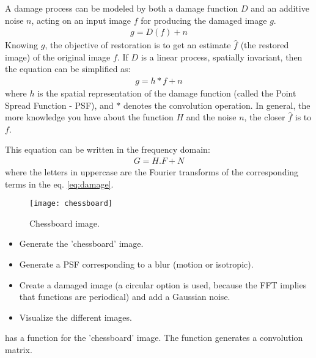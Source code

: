 A damage process can be modeled by both a damage function $D$ and an additive noise $n$, acting on an input image $f$ for producing the damaged image $g$.
\begin{eqnarray}
g=D(f)+n
\end{eqnarray}
Knowing $g$, the objective of restoration is to get an estimate $\hat{f}$ (the restored image) of the original image $f$. If $D$ is a linear process, spatially invariant, then the equation can be simplified as:
\begin{eqnarray}
g=h*f+n \label{eq:damage}
\end{eqnarray} 
where $h$ is the spatial representation of the damage function (called the Point Spread Function - PSF), and $*$ denotes the convolution operation.
In general, the more knowledge you have about the function $H$ and the noise $n$, the closer $\hat{f}$ is to $f$.

This equation can be written in the frequency domain:
\begin{eqnarray}
G=H.F+N
\end{eqnarray}
where the letters in uppercase are the Fourier transforms of the corresponding terms in the eq. \ref{eq:damage}.

	\begin{figure}[htbp]
	 \centering\caption{Chessboard image.}%
	\texttt{[image: chessboard]}%
	\end{figure}
	
\begin{qbox}
\begin{itemize}
	\item Generate the 'chessboard' image.
	\item Generate a PSF corresponding to a blur (motion or isotropic).
	\item Create a damaged image (a circular option is used, because the FFT implies that functions are periodical) and add a Gaussian noise.
	\item Visualize the different images. 
\end{itemize}
\end{qbox}

\begin{mcomment}
\begin{mremark}
 \matlabregistered{} has a  function for the 'chessboard' image. The  function generates a convolution matrix.
\end{mremark}
\end{mcomment}

